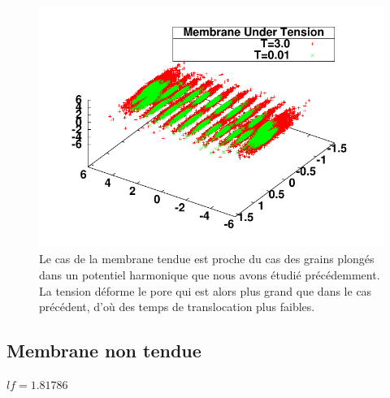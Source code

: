 \begin{figure}[H]
\begin{center}
\begin{minipage}{0.29\linewidth}
\end{minipage}
\includegraphics[width=\textwidth]{3dhighmembranetension.pdf}  
\caption[Membrane tendue]{Le cas de la membrane tendue est proche du cas des grains plongés dans un potentiel harmonique que nous avons étudié précédemment. La tension déforme le pore qui est alors plus grand que dans le cas précédent, d'où des temps de translocation plus faibles.}

\label{membranetendue}
\end{center}
\end{figure}



\subsection{Membrane non tendue}

$lf=1.81786$


